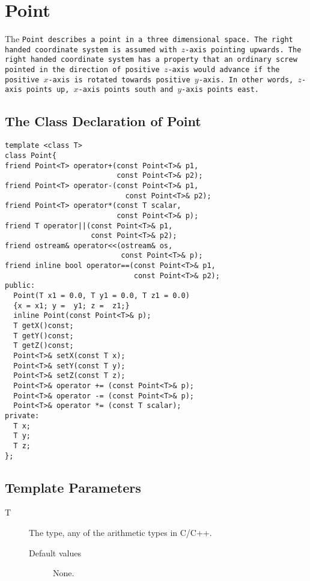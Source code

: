 \section{Point}

The \tt Point \rm describes a point in a three dimensional space.  The
right  handed  coordinate  system is  assumed  with $z$-axis  pointing
upwards. The  right handed coordinate   system has a property  that an
ordinary  screw  pointed in  the  direction of positive $z$-axis would
advance     if  the positive   $x$-axis is   rotated  towards positive
$y$-axis.  In  other   words, $z$-axis   points   up, $x$-axis  points
south and $y$-axis points east.

\subsection{The Class Declaration of Point}
\begin{verbatim}
template <class T>
class Point{
friend Point<T> operator+(const Point<T>& p1, 
                          const Point<T>& p2);
friend Point<T> operator-(const Point<T>& p1,
                            const Point<T>& p2);
friend Point<T> operator*(const T scalar, 
                          const Point<T>& p);
friend T operator||(const Point<T>& p1, 
                    const Point<T>& p2);
friend ostream& operator<<(ostream& os, 
                           const Point<T>& p);
friend inline bool operator==(const Point<T>& p1, 
                              const Point<T>& p2);
public:
  Point(T x1 = 0.0, T y1 = 0.0, T z1 = 0.0)
  {x = x1; y =  y1; z =  z1;}
  inline Point(const Point<T>& p);
  T getX()const;
  T getY()const;
  T getZ()const;
  Point<T>& setX(const T x);
  Point<T>& setY(const T y);
  Point<T>& setZ(const T z);
  Point<T>& operator += (const Point<T>& p); 
  Point<T>& operator -= (const Point<T>& p);
  Point<T>& operator *= (const T scalar);
private:
  T x;
  T y;
  T z;
};
\end{verbatim}

\subsection{Template Parameters}
\begin{description}
  \item[T] The type, any of the arithmetic types in C/C++.
    \begin{description}
      \item[Default values] None.
     \end{description}
\end{description}

